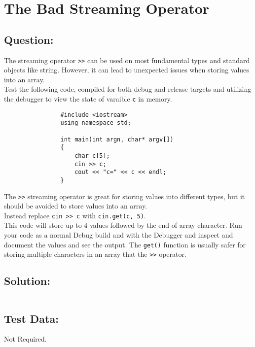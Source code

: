 \documentclass[Lab-B.tex]{subfiles}
\begin{document}
    \section{The Bad Streaming Operator}
        \subsection*{Question:}
            The streaming operator \texttt{>>} can be used on most fundamental types and standard objects like string. However, 
            it can lead to unexpected issues when storing values into an array.\\

            Test the following code, compiled for both debug and release targets and 
            utilizing the debugger to view the state of varaible \texttt{c} in memory. \\
    
            \begin{verbatim}
                #include <iostream>
                using namespace std;

                int main(int argn, char* argv[])
                {
                    char c[5];
                    cin >> c;
                    cout << "c=" << c << endl;
                }
            \end{verbatim}

            The \texttt{>>} streaming operator is great for storing values into different types, 
            but it should be avoided to store values into an array.\\

            Instead replace \texttt{cin >> c} with \texttt{cin.get(c, 5)}.\\
            This code will store up to 4 values followed by the end of array character. 
            Run your code as a normal Debug build and with the Debugger and inspect and document the values and see the output. 
            The \texttt{get()} function is usually safer for storing multiple characters in an array that the \texttt{>>} operator.
            
        \subsection*{Solution:}
            \inputminted{cpp}{../02-Bad-Streaming/Bad-Streaming.cpp}%

        \subsection*{Test Data:}
            Not Required.
        
\end{document}
